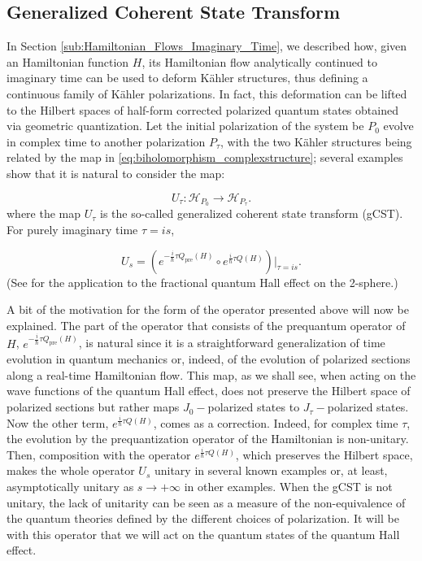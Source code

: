 \documentclass[a4paper,11pt]{article}
\begin{document}
\subsection{Generalized Coherent State Transform}
\label{subs:gcst}

In Section \ref{sub:Hamiltonian_Flows_Imaginary_Time}, we described how, given an Hamiltonian function $H$, 
its Hamiltonian flow analytically continued to imaginary time can be used to deform K\"ahler structures, thus defining a continuous family of K\"ahler polarizations. 
In fact, this deformation can be lifted to the Hilbert spaces of half-form corrected polarized quantum states obtained via geometric quantization. Let the initial polarization of the system be $P_{0}$ evolve in complex time to another polarization $P_{\tau}$, with the two K\"ahler structures being related by the map in \eqref{eq:biholomorphism_complexstructure}; several examples show that it is natural to consider the  map:

\begin{equation}
    U_{\tau}: \mathcal{H}_{P_0}\rightarrow\mathcal{H}_{P_{\tau}}.
\end{equation}
where the map $U_{\tau}$ is the so-called generalized coherent state transform (gCST). For purely 
imaginary time $\tau = is$, 

\begin{equation}\label{timescst}
    U_{s} = \left(e^{-\frac{i}{\hbar}\tau Q_{\mathrm{pre}}(H)}\circ e^{\frac{i}{\hbar}\tau Q(H)}\right)\bigg|_{\tau=is}.
\end{equation}
(See \cite{matos:mera:mourao:mourao:nunes:2023} for the application to the fractional quantum Hall effect on the 2-sphere.)




A bit of the motivation for the form of the operator presented above will now be explained. The part of the operator that consists of the prequantum operator of $H$, $e^{-\frac{i}{\hbar}\tau Q_{\mathrm{pre}}(H)}$, is natural since it is a straightforward generalization of time evolution in quantum mechanics or, indeed, of the evolution of polarized sections along a real-time Hamiltonian flow. This map, as we shall see, when acting on the wave functions of the quantum Hall effect, does not preserve the Hilbert space of polarized sections but rather maps $J_{0}-$polarized states to $J_{\tau}-$polarized states. Now the other term, $e^{\frac{i}{\hbar}\tau Q(H)}$, comes as a correction. Indeed, for complex time $\tau$, the evolution by the prequantization operator of the Hamiltonian is non-unitary. Then, composition with the operator  $e^{\frac{i}{\hbar}\tau Q(H)}$, which preserves the Hilbert space, makes the whole operator $U_{s}$ unitary in several known examples or, at least, asymptotically unitary as $s\to +\infty$ in other examples.
 When the gCST is not unitary, the lack of unitarity can be seen as a measure of the non-equivalence of the quantum theories defined by the different choices of polarization. It will be with this operator that we will act on the quantum states of the quantum Hall effect.
\end{document}
